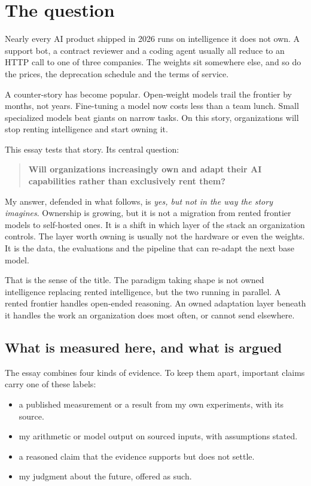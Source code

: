 \section{The question}\label{sec:question}

Nearly every AI product shipped in 2026 runs on intelligence it does not own. A support bot, a contract reviewer and a coding agent usually all reduce to an HTTP call to one of three companies. The weights sit somewhere else, and so do the prices, the deprecation schedule and the terms of service.

A counter-story has become popular. Open-weight models trail the frontier by months, not years. Fine-tuning a model now costs less than a team lunch. Small specialized models beat giants on narrow tasks. On this story, organizations will stop renting intelligence and start owning it.

This essay tests that story. Its central question:

\begin{quote}
\textbf{Will organizations increasingly own and adapt their AI capabilities rather than exclusively rent them?}
\end{quote}

My answer, defended in what follows, is \emph{yes, but not in the way the story imagines}. Ownership is growing, but it is not a migration from rented frontier models to self-hosted ones. It is a shift in which layer of the stack an organization controls. The layer worth owning is usually not the hardware or even the weights. It is the data, the evaluations and the pipeline that can re-adapt the next base model.

That is the sense of the title. The paradigm taking shape is not owned intelligence replacing rented intelligence, but the two running in parallel. A rented frontier handles open-ended reasoning. An owned adaptation layer beneath it handles the work an organization does most often, or cannot send elsewhere.

\subsection{What is measured here, and what is argued}

The essay combines four kinds of evidence. To keep them apart, important claims carry one of these labels:

\begin{itemize}
\tightlist
\item
   a published measurement or a result from my own experiments, with its source.
\item
   my arithmetic or model output on sourced inputs, with assumptions stated.
\item
   a reasoned claim that the evidence supports but does not settle.
\item
   my judgment about the future, offered as such.
\end{itemize}

